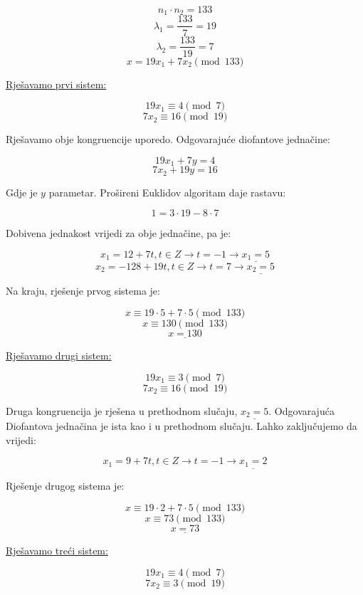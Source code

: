 \documentclass[12pt]{article}
\begin{document}
$$n_{1} \cdot n_{2} = 133$$
$$\lambda_{1} = \frac{133}{7} = 19$$
$$\lambda_{2} = \frac{133}{19} = 7$$
$$x = 19x_{1} + 7x_{2} \pmod{133}$$\vspace{1mm}

\underline{Rješavamo prvi sistem:}

$$19x_{1} \equiv 4 \pmod{7}$$
$$7x_{2} \equiv 16 \pmod{19}$$\vspace{1mm}

Rješavamo obje kongruencije uporedo. Odgovarajuće diofantove jednačine:

$$19x_{1} + 7y = 4$$
$$7x_{2} + 19y = 16$$\vspace{1mm}

Gdje je $y$ parametar. Prošireni Euklidov algoritam daje rastavu:

$$1 = 3 \cdot 19 - 8 \cdot 7$$\vspace{1mm}

Dobivena jednakost vrijedi za obje jednačine, pa je:

$$x_{1} = 12 + 7t, t \in Z \to t = -1 \to \underline{x_{1} = 5}$$
$$x_{2} = -128 + 19t, t \in Z \to t = 7 \to \underline{x_{2} = 5}$$\vspace{1mm}

Na kraju, rješenje prvog sistema je:

$$x \equiv 19 \cdot 5 + 7 \cdot 5 \pmod{133}$$
$$x \equiv 130 \pmod{133}$$
$$\underline{x = 130}$$\vspace{1mm}

\underline{Rješavamo drugi sistem:}

$$19x_{1} \equiv 3 \pmod{7}$$
$$7x_{2} \equiv 16 \pmod{19}$$\vspace{1mm}

Druga kongruencija je rješena u prethodnom slučaju, $\underline{x_{2} = 5}$. Odgovarajuća Diofantova jednačina je ista kao i u prethodnom slučaju. Lahko zaključujemo da vrijedi:

$$x_{1} = 9 + 7t, t \in Z \to t = -1 \to \underline{x_{1} = 2}$$\vspace{1mm}

Rješenje drugog sistema je:

$$x \equiv 19 \cdot 2 + 7 \cdot 5 \pmod{133}$$
$$x \equiv 73 \pmod{133}$$
$$\underline{x = 73}$$\vspace{1mm}

\underline{Rješavamo treći sistem:}

$$19x_{1} \equiv 4 \pmod{7}$$
$$7x_{2} \equiv 3 \pmod{19}$$\vspace{1mm}
\end{document}
